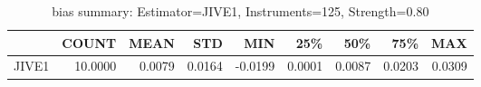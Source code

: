 \begin{table}[ht]
\centering
\caption{bias summary: Estimator=JIVE1, Instruments=125, Strength=0.80}
\begin{tabular}{lrrrrrrrr}
\toprule
 & COUNT & MEAN & STD & MIN & 25\% & 50\% & 75\% & MAX \\
\midrule
JIVE1 & 10.0000 & 0.0079 & 0.0164 & -0.0199 & 0.0001 & 0.0087 & 0.0203 & 0.0309 \\
\bottomrule
\end{tabular}
\end{table}

